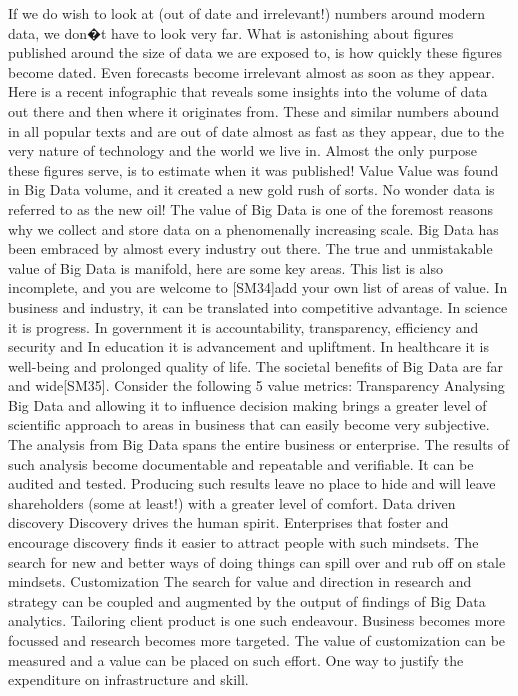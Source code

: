 If we do wish to look at (out of date and irrelevant!) numbers around modern data, we don�t have to look very far.  What is astonishing about figures published around the size of data we are exposed to, is how quickly these figures become dated.  Even forecasts become irrelevant almost as soon as they appear.  Here is a recent infographic that reveals some insights into the volume of data out there and then where it originates from. 
These and similar numbers abound in all popular texts and are out of date almost as fast as they appear, due to the very nature of technology and the world we live in.  Almost the only purpose these figures serve, is to estimate when it was published! 
Value 
Value was found in Big Data volume, and it created a new gold rush of sorts.  No wonder data is referred to as the new oil!  The value of Big Data is one of the foremost reasons why we collect and store data on a phenomenally increasing scale.  Big Data has been embraced by almost every industry out there.
The true and unmistakable value of Big Data is manifold, here are some key areas.  This list is also incomplete, and you are welcome to [SM34]add your own list of areas of value.
In business and industry, it can be translated into competitive advantage. 
In science it is progress.
In government it is accountability, transparency, efficiency and security and 
In education it is advancement and upliftment.
In healthcare it is well-being and prolonged quality of life.
The societal benefits of Big Data are far and wide[SM35].  
Consider the following 5 value metrics:
Transparency
Analysing Big Data and allowing it to influence decision making brings a greater level of scientific approach to areas in business that can easily become very subjective.  The analysis from Big Data spans the entire business or enterprise.  The results of such analysis become documentable and repeatable and verifiable.  It can be audited and tested.  Producing such results leave no place to hide and will leave shareholders (some at least!) with a greater level of comfort.
Data driven discovery
Discovery drives the human spirit.  Enterprises that foster and encourage discovery finds it easier to attract people with such mindsets. The search for new and better ways of doing things can spill over and rub off on stale mindsets.
Customization
The search for value and direction in research and strategy can be coupled and augmented by the output of findings of Big Data analytics.   Tailoring client product is one such endeavour.  Business becomes more focussed and research becomes more targeted.  The value of customization can be measured and a value can be placed on such effort.  One way to justify the expenditure on infrastructure and skill.

